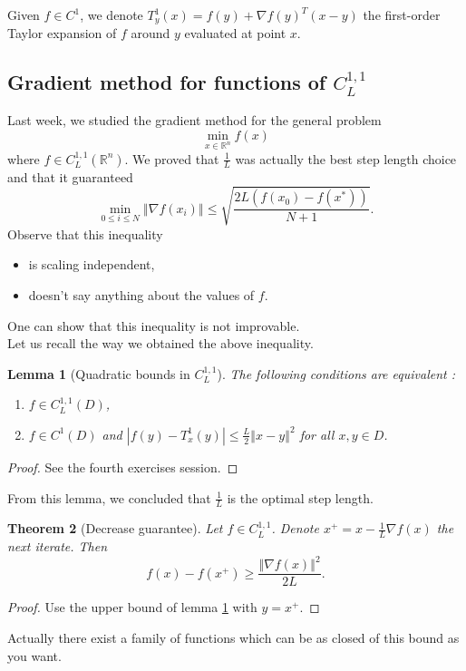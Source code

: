 \documentclass{article}
\newtheorem{theorem}{Theorem}
\newtheorem{lemma}[theorem]{Lemma}
\theoremstyle{definition}
\newcommand{\vnorm}[1]{\left\Vert #1 \right\Vert}
\begin{document}
\noindent Given $f \in C^1$, we denote $T^1_y(x) = f(y) + \nabla f(y)^T (x-y)$ the first-order Taylor expansion of $f$ around $y$ evaluated at point $x$.

\subsection{Gradient method for functions of $C_L^{1,1}$}

Last week, we studied the gradient method for the general problem
\begin{equation*}
\min_{x \in \mathbb{R}^n} f(x)
\end{equation*}
where $f \in C_L^{1,1}(\mathbb{R}^n)$. We proved that $\frac{1}{L}$ was actually the best step length choice and that it guaranteed
\begin{equation}
\min_{0 \le i \le N} \vnorm{\nabla f(x_i)} \le \sqrt{\frac{2L(f(x_0)-f(x^*))}{N+1}} .
\label{MinGrad}
\end{equation}
Observe that this inequality
\begin{itemize}
\item is scaling independent,
\item doesn't say anything about the values of $f$.
\end{itemize}
One can show that this inequality is not improvable. \\

Let us recall the way we obtained the above inequality.

\begin{lemma}[Quadratic bounds in $C_L^{1,1}$]
The following conditions are equivalent :
\begin{enumerate}[label=(\alph*)]
\item $f \in C_L^{1,1}(D)$,
\item $f \in C^1(D)$ and $|f(y) - T_x^1(y)| \le \frac{L}{2}\vnorm{x-y}^2$ for all $x,y \in D$.
\end{enumerate}
\label{qbCL}
\end{lemma}
\begin{proof}
See the fourth exercises session.
\end{proof}

From this lemma, we concluded that $\frac{1}{L}$ is the optimal step length.

\begin{theorem}[Decrease guarantee]
Let $f \in C_L^{1,1}$. Denote $x^+ = x - \frac{1}{L}\nabla f(x)$ the next iterate. Then
\begin{equation*}
f(x) - f(x^+) \ge \frac{{\vnorm{\nabla f(x)}}^2}{2L} .
\end{equation*}
\label{DecreaseGuar}
\end{theorem}
\begin{proof}
Use the upper bound of lemma \ref{qbCL} with $y = x^+$.
\end{proof}
\noindent Actually there exist a family of functions which can be as closed of this bound as you want. \\
\end{document}
